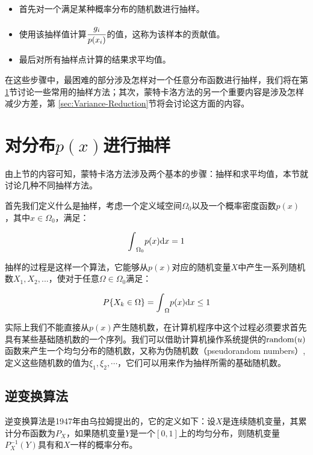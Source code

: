 \begin{itemize}
	\item 首先对一个满足某种概率分布的随机数进行抽样。
	\item 使用该抽样值计算$ \cfrac{g_i}{p(x_i)}$的值，这称为该样本的贡献值。
	\item 最后对所有抽样点计算的结果求平均值。
\end{itemize}

在这些步骤中，最困难的部分涉及怎样对一个任意分布函数进行抽样，我们将在第\ref{sec:Sampling-Random-Variables}节讨论一些常用的抽样方法；其次，蒙特卡洛方法的另一个重要内容是涉及怎样减少方差，第 \ref{sec:Variance-Reduction}节将会讨论这方面的内容。





\section{对分布$p(x)$进行抽样}\label{sec:Sampling-Random-Variables}
由上节的内容可知，蒙特卡洛方法涉及两个基本的步骤：抽样和求平均值，本节就讨论几种不同抽样方法。

首先我们定义什么是抽样，考虑一个定义域空间$\Omega_0$以及一个概率密度函数$p(x)$，其中$x\in\Omega_0$，满足：

\begin{equation}
	{\rm \int}_{\Omega_0}p(x){\rm d}x=1
\end{equation}

抽样的过程是这样一个算法，它能够从$p(x)$对应的随机变量$X$中产生一系列随机数$X_1,X_2,...$，使对于任意$\Omega\in\Omega_0$满足：

\begin{equation}
	P\{X_k\in\Omega\}={\rm \int}_{\Omega}p(x){\rm d}x\leq 1
\end{equation}

实际上我们不能直接从$p(x)$产生随机数，在计算机程序中这个过程必须要求首先具有某些基础随机数的一个序列。我们可以借助计算机操作系统提供的${\rm random}(u)$函数来产生一个均匀分布的随机数，又称为伪随机数（pseudorandom numbers）, 定义这些随机数的值为$\xi_1,\xi_2,\cdots$，它们可以用来作为抽样所需的基础随机数。




\subsection{逆变换算法}\label{sec:mc-inversion-method}
逆变换算法是1947年由乌拉姆提出的，它的定义如下：设$X$是连续随机变量，其累计分布函数为$P_X$，如果随机变量$Y$是一个$[0,1]$上的均匀分布，则随机变量$P^{-1}_X(Y)$具有和$X$一样的概率分布。

